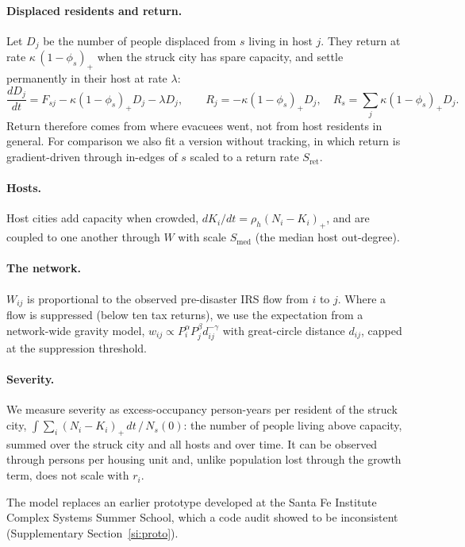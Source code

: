 \documentclass[11pt]{article}
\begin{document}
\paragraph{Displaced residents and return.} Let $D_j$ be the number of people displaced from $s$ living in host $j$. They return at rate $\kappa\,(1-\phi_s)_+$ when the struck city has spare capacity, and settle permanently in their host at rate $\lambda$:
\begin{equation}
\frac{dD_j}{dt}=F_{sj}-\kappa(1-\phi_s)_+D_j-\lambda D_j,\qquad R_j=-\kappa(1-\phi_s)_+D_j,\quad R_s=\textstyle\sum_j \kappa(1-\phi_s)_+D_j .
\label{eq:D}
\end{equation}
Return therefore comes from where evacuees went, not from host residents in general. For comparison we also fit a version without tracking, in which return is gradient-driven through in-edges of $s$ scaled to a return rate $S_{\text{ret}}$.

\paragraph{Hosts.} Host cities add capacity when crowded, $dK_i/dt=\rho_h (N_i-K_i)_+$, and are coupled to one another through $W$ with scale $S_{\text{med}}$ (the median host out-degree).

\paragraph{The network.} $W_{ij}$ is proportional to the observed pre-disaster IRS flow from $i$ to $j$. Where a flow is suppressed (below ten tax returns), we use the expectation from a network-wide gravity model, $w_{ij}\propto P_i^{\alpha}P_j^{\beta}d_{ij}^{-\gamma}$ with great-circle distance $d_{ij}$, capped at the suppression threshold.

\paragraph{Severity.} We measure severity as excess-occupancy person-years per resident of the struck city, $\int\sum_i (N_i-K_i)_+\,dt\,/\,N_s(0)$: the number of people living above capacity, summed over the struck city and all hosts and over time. It can be observed through persons per housing unit and, unlike population lost through the growth term, does not scale with $r_i$.

The model replaces an earlier prototype developed at the Santa Fe Institute Complex Systems Summer School, which a code audit showed to be inconsistent (Supplementary Section~\ref{si:proto}).
\end{document}
